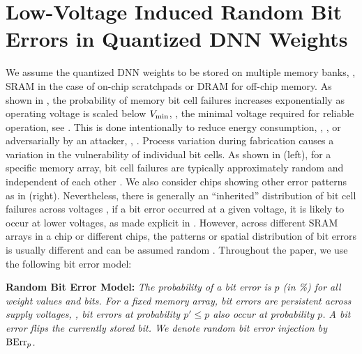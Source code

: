 \section{Low-Voltage Induced Random Bit Errors in Quantized DNN Weights}
\label{sec:errors}

We assume the quantized DNN weights to be stored  on multiple memory banks, \eg, SRAM in the case of on-chip scratchpads or DRAM for off-chip memory. As shown in \cite{GanapathyDAC2017,KimDATE2018,ChandramoorthyHPCA2019}, the probability of memory bit cell failures increases exponentially as operating voltage is scaled below $\Vmin$, \ie, the minimal voltage required for reliable operation, see . This is done intentionally to reduce energy consumption, \eg, \cite{ChandramoorthyHPCA2019,KimDATE2018,KoppulaMICRO2019}, or adversarially by an attacker, \eg, \cite{TangUSENIX2017}. Process variation during fabrication causes a variation in the vulnerability of individual bit cells. As shown in  (left), for a specific memory array, bit cell failures are typically approximately random and independent of each other \cite{GanapathyDAC2017}. We also consider chips showing other error patterns as in  (right). Nevertheless, there is generally an ``inherited'' distribution of bit cell failures across voltages \cite{GanapathyHPCA2019}, if a bit error occurred at a given voltage, it is likely to occur at lower voltages, as made explicit in . However, across different SRAM arrays in a chip or different chips, the patterns or spatial distribution of bit errors is usually different and can be assumed random \cite{ChandramoorthyHPCA2019}. Throughout the paper, we use the following bit error model:

\textbf{Random Bit Error Model:}
\textit{The probability of a bit error is $p$ (in \%) for all weight values and bits. For a fixed memory array, bit errors are persistent across supply voltages, \ie, bit errors at probability $p'{\leq}p$ also occur at probability $p$. A bit error flips the currently stored bit. We denote random bit error injection by $\biterror_p$.}

